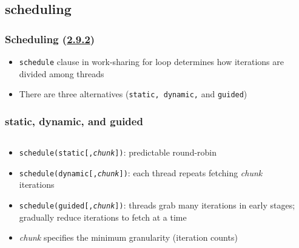\documentclass[12pt,dvipdfmx]{beamer}
\newcommand{\sectionompfor}{{\href{https://www.openmp.org/spec-html/5.0/openmpsu41.html\#x64-1290002.9.2}{2.9.2}}}
\newcommand{\ao}[1]{{\color{blue}#1}}
\begin{document}
\subsection{scheduling}

\begin{frame}[fragile]
\frametitle{Scheduling (\sectionompfor)}
\begin{itemize}
\item \ao{\tt schedule} clause in work-sharing for loop determines
how iterations are divided among threads
\item There are three alternatives 
  (\ao{\tt static, dynamic,} and \ao{\tt guided})
\end{itemize}
\end{frame}


\begin{frame}
\frametitle{static, dynamic, and guided}
\begin{columns}[t]
  \begin{column}{0.53\textwidth}
\begin{itemize}
\item {\tt schedule(\ao{static{\rm [,{\em chunk}]}})}: 
  predictable round-robin
\item {\tt schedule(\ao{dynamic{\rm [,{\em chunk}]}})}:
  each thread repeats fetching {\em chunk} iterations
\item {\tt schedule(\ao{guided{\rm [,{\em chunk}]}})}:
  threads grab many iterations in early stages;
  gradually reduce iterations to fetch at a time

\item \ao{\em chunk} specifies the minimum granularity
  (iteration counts)
\end{itemize}
  \end{column}

  \begin{column}{0.47\textwidth}
\def\svgwidth{\textwidth}
{\scriptsize }
  \end{column}
\end{columns}
\end{frame}
\end{document}
